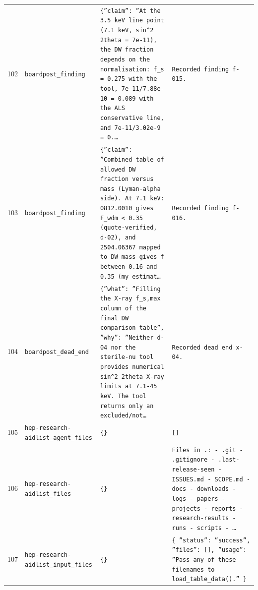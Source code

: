 \documentclass[11pt,a4paper]{article}
\begin{document}
\begin{longtable}{@{}p{}p{}p{}p{}@{}}
102 & \texttt{board}\newline\texttt{post\_\allowbreak{}finding} & \texttt{\{''claim'':\allowbreak{} ''At the 3.5 keV line point (7.1 keV,\allowbreak{} sin\textasciicircum{}\allowbreak{}2 2theta =\allowbreak{} 7e-11)\allowbreak{},\allowbreak{} the DW fraction depends on the normalisation:\allowbreak{} f\_\allowbreak{}s =\allowbreak{} 0.275 with the tool,\allowbreak{} 7e-11/\allowbreak{}7.88e-10 =\allowbreak{} 0.089 with the ALS conservative line,\allowbreak{} and 7e-11/\allowbreak{}3.02e-9 =\allowbreak{} 0.\ldots{}\allowbreak{}} & \texttt{Recorded finding f-015.} \\
103 & \texttt{board}\newline\texttt{post\_\allowbreak{}finding} & \texttt{\{''claim'':\allowbreak{} ''Combined table of allowed DW fraction versus mass (Lyman-alpha side)\allowbreak{}. At 7.1 keV:\allowbreak{} 0812.0010 gives F\_\allowbreak{}wdm \textless{}\allowbreak{} 0.35 (quote-verified,\allowbreak{} d-02)\allowbreak{},\allowbreak{} and 2504.06367 mapped to DW mass gives f between 0.16 and 0.35 (my estimat\ldots{}\allowbreak{}} & \texttt{Recorded finding f-016.} \\
104 & \texttt{board}\newline\texttt{post\_\allowbreak{}dead\_\allowbreak{}end} & \texttt{\{''what'':\allowbreak{} ''Filling the X-ray f\_\allowbreak{}s,\allowbreak{}max column of the final DW comparison table'',\allowbreak{} ''why'':\allowbreak{} ''Neither d-04 nor the sterile-nu tool provides numerical sin\textasciicircum{}\allowbreak{}2 2theta X-ray limits at 7.1-45 keV. The tool returns only an excluded/\allowbreak{}not\ldots{}\allowbreak{}} & \texttt{Recorded dead end x-04.} \\
105 & \texttt{hep-research-aid}\newline\texttt{list\_\allowbreak{}agent\_\allowbreak{}files} & \texttt{\{\}\allowbreak{}} & \texttt{[]\allowbreak{}} \\
106 & \texttt{hep-research-aid}\newline\texttt{list\_\allowbreak{}files} & \texttt{\{\}\allowbreak{}} & \texttt{Files in .:\allowbreak{}   - .git   - .gitignore   - .last-release-seen   - ISSUES.md   - SCOPE.md   - docs   - downloads   - logs   - papers   - projects   - reports   - research-results   - runs   - scripts   - \ldots{}\allowbreak{}} \\
107 & \texttt{hep-research-aid}\newline\texttt{list\_\allowbreak{}input\_\allowbreak{}files} & \texttt{\{\}\allowbreak{}} & \texttt{\{   ''status'':\allowbreak{} ''success'',\allowbreak{}   ''files'':\allowbreak{} []\allowbreak{},\allowbreak{}   ''usage'':\allowbreak{} ''Pass any of these filenames to load\_\allowbreak{}table\_\allowbreak{}data()\allowbreak{}.'' \}\allowbreak{}} \\

\end{longtable}
\end{document}
